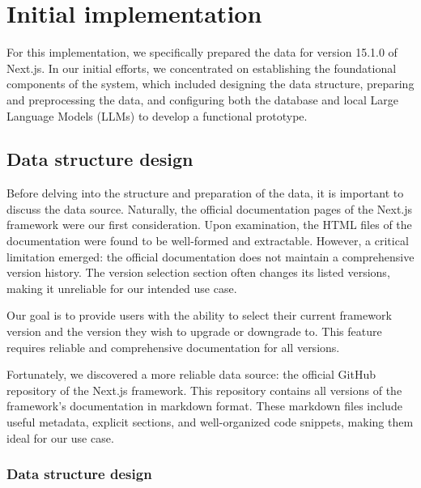 \chapter{Initial implementation}

For this implementation, we specifically prepared the data for version 15.1.0 of Next.js. In our initial efforts, we concentrated on establishing the foundational components of the system, which included designing the data structure, preparing and preprocessing the data, and configuring both the database and local Large Language Models (LLMs) to develop a functional prototype.


\section{Data structure design}

Before delving into the structure and preparation of the data, it is important to discuss the data source. Naturally, the official documentation pages of the Next.js framework were our first consideration. Upon examination, the HTML files of the documentation were found to be well-formed and extractable. However, a critical limitation emerged: the official documentation does not maintain a comprehensive version history. The version selection section often changes its listed versions, making it unreliable for our intended use case.

Our goal is to provide users with the ability to select their current framework version and the version they wish to upgrade or downgrade to. This feature requires reliable and comprehensive documentation for all versions.

Fortunately, we discovered a more reliable data source: the official GitHub repository of the Next.js framework. This repository contains all versions of the framework's documentation in markdown format. These markdown files include useful metadata, explicit sections, and well-organized code snippets, making them ideal for our use case.

\subsection{Data structure design}

